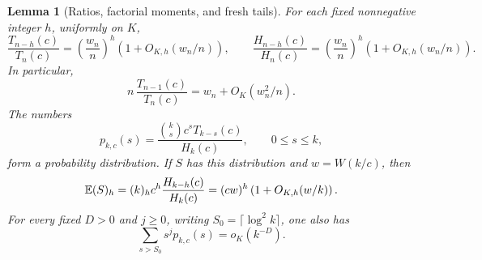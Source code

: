 \documentclass[11pt,letterpaper]{article}
\newtheorem{lemma}[theorem]{Lemma}\newtheorem{proposition}[theorem]{Proposition}\newtheorem{corollary}[theorem]{Corollary}
\theoremstyle{remark}\newtheorem{remark}[theorem]{Remark}
\newcommand{\fall}[2]{(#1)_{#2}}\newcommand{\rise}[2]{#1^{\overline{#2}}}
\theoremstyle{definition}\newtheorem{definition}[theorem]{Definition}
\begin{document}
\begin{lemma}[Ratios, factorial moments, and fresh tails]\label{sgm:md:cm:ratio}
For each fixed nonnegative integer \(h\), uniformly on \(K\),
\begin{equation}\label{sgm:md:cm:ratios}
 \frac{T_{n-h}(c)}{T_n(c)}
 =\left(\frac{w_n}{n}\right)^h
       \left(1+O_{K,h}(w_n/n)\right),\qquad
 \frac{H_{n-h}(c)}{H_n(c)}
 =\left(\frac{w_n}{n}\right)^h
       \left(1+O_{K,h}(w_n/n)\right).
\end{equation}
In particular,
\begin{equation}\label{sgm:md:cm:birth-ratio}
 n\,\frac{T_{n-1}(c)}{T_n(c)}
 =w_n+O_K(w_n^2/n).
\end{equation}
The numbers
\begin{equation}\label{sgm:md:cm:fresh-law}
 p_{k,c}(s)=\frac{\binom ks c^sT_{k-s}(c)}{H_k(c)},
 \qquad 0\le s\le k,
\end{equation}
form a probability distribution. If \(S\) has this distribution and
\(w=W(k/c)\), then
\begin{equation}\label{sgm:md:cm:fresh-factorials}
 \E\fall{S}{h}=\fall{k}{h}c^h\frac{H_{k-h}(c)}{H_k(c)}
 =(cw)^h\left(1+O_{K,h}(w/k)\right).
\end{equation}
For every fixed \(D>0\) and \(j\ge0\), writing
\(S_0=\lceil\log^2k\rceil\), one also has
\begin{equation}\label{sgm:md:cm:fresh-tail}
 \sum_{s>S_0}s^j p_{k,c}(s)=o_K(k^{-D}).
\end{equation}
\end{lemma}
\end{document}
